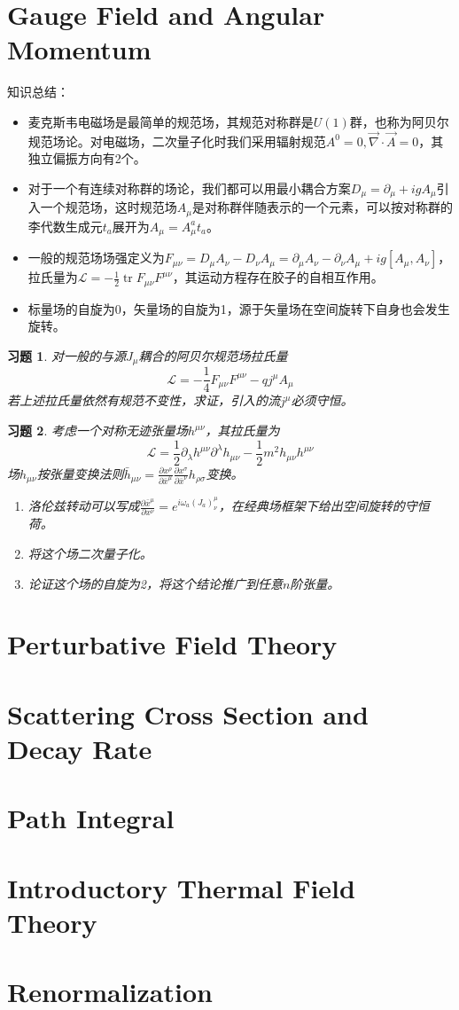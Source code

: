 \documentclass[a4paper,11pt]{ctexart}
\newtheorem{ex}{习题}[section]
\newcommand{\beq}{\begin{equation}}
\newcommand{\eeq}{\end{equation}}
\newcommand{\lag}{\mathcal{L}}
\DeclareMathOperator{\tr}{tr}
\newcommand{\del}{\vec{\nabla}}
\newcommand{\pfrac}[2]{\frac{\partial #1}{\partial #2}}
\begin{document}
\newpage
\section{Gauge Field and Angular Momentum}
知识总结：
\begin{itemize}
\item 麦克斯韦电磁场是最简单的规范场，其规范对称群是$U(1)$群，也称为阿贝尔规范场论。对电磁场，二次量子化时我们采用辐射规范$A^0=0,\del \cdot \vec A = 0$，其独立偏振方向有2个。
\item 对于一个有连续对称群的场论，我们都可以用最小耦合方案$D_\mu = \partial_\mu + igA_\mu$引入一个规范场，这时规范场$A_\mu$是对称群伴随表示的一个元素，可以按对称群的李代数生成元$t_a$展开为$A_\mu = A_\mu^a t_a$。
\item 一般的规范场场强定义为$F_{\mu \nu} = D_\mu A_\nu - D_\nu A_\mu = \partial_\mu A_\nu - \partial_\nu A_\mu +ig[A_\mu,A_\nu]$，拉氏量为$\lag = -\frac{1}{2} \tr F_{\mu \nu}F^{\mu \nu}$，其运动方程存在胶子的自相互作用。
\item 标量场的自旋为0，矢量场的自旋为1，源于矢量场在空间旋转下自身也会发生旋转。
\end{itemize}
\begin{ex}
对一般的与源$J_\mu$耦合的阿贝尔规范场拉氏量
\beq
\lag = -\frac{1}{4} F_{\mu \nu} F^{\mu \nu} -q j^\mu A_\mu
\eeq
若上述拉氏量依然有规范不变性，求证，引入的流$j^\mu$必须守恒。
\end{ex}
\begin{ex}
考虑一个对称无迹张量场$h^{\mu \nu}$，其拉氏量为
\beq
\lag = \frac{1}{2} \partial_\lambda h^{\mu \nu} \partial^\lambda h_{\mu \nu} - \frac{1}{2}m^2 h_{\mu \nu}h^{\mu \nu}
\eeq
场$h_{\mu \nu}$按张量变换法则$\bar{h}_{\mu \nu} = \pfrac{x^\rho}{\bar{x}^\mu}\pfrac{x^\sigma}{\bar{x}^\nu} h_{\rho \sigma}$变换。
\begin{enumerate}
\item 洛伦兹转动可以写成$\pfrac{\bar x^{\mu}}{x^\nu}=e^{i \omega_a (J_a)^{\mu}_{\nu}}$，在经典场框架下给出空间旋转的守恒荷。
\item 将这个场二次量子化。
\item 论证这个场的自旋为2，将这个结论推广到任意$n$阶张量。
\end{enumerate}
\end{ex}

\section{Perturbative Field Theory}
\section{Scattering Cross Section and Decay Rate}
\section{Path Integral}
\section{Introductory Thermal Field Theory}
\section{Renormalization}
\end{document}

